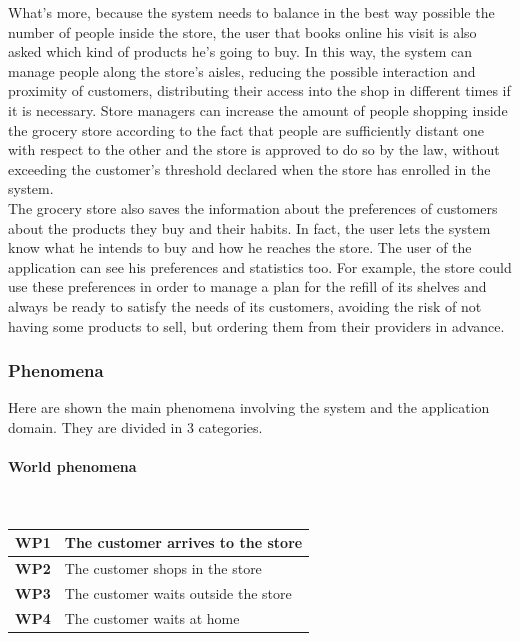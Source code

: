 \documentclass[]{article}
\begin{document}
What’s more, because the system needs to balance in the best way possible the number of people inside the store, the user that books online his visit is also asked which kind of products he’s going to buy. In this way, the system can manage people along the store’s aisles, reducing the possible interaction and proximity of customers, distributing their access into the shop in different times if it is necessary. Store managers can increase the amount of people shopping inside the grocery store according to the fact that people are sufficiently distant one with respect to the other and the store is approved to do so by the law, without exceeding the customer’s threshold declared when the store has enrolled in the system.\\
The grocery store also saves the information about the preferences of customers about the products they buy and their habits. In fact, the user lets the system know what he intends to buy and how he reaches the store. The user of the application can see his preferences and statistics too. For example, the store could use these preferences in order to manage a plan for the refill of its shelves and always be ready to satisfy the needs of its customers, avoiding the risk of not having some products to sell, but ordering them from their providers in advance.\\

			
	
		
	
		\subsubsection{Phenomena}
		Here are shown the main phenomena involving the system and the application domain. They are divided in 3 categories.
		\newline
		
		\paragraph{World phenomena}
		\textbf{}\\\newline
			\begin{tabular}{|c|l|}
				\hline
				\rowcolor[HTML]{DCDCDC} 
				\textbf{WP1} & 
				\begin{minipage}[t]{13cm}
				The customer arrives to the store 
				\end{minipage} 
				\\ \hline
				\textbf{WP2} & The customer shops in the store \\ \hline
				\rowcolor[HTML]{DCDCDC} 
				\textbf{WP3} & The customer waits outside the store \\ \hline
				\textbf{WP4} & The customer waits at home \\ \hline
			\end{tabular}
		\bigskip
			
\end{document}
